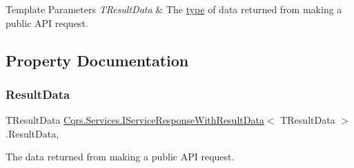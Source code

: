 \begin{DoxyTemplParams}{Template Parameters}
{\em T\+Result\+Data} & The \hyperlink{}{type} of data returned from making a public A\+PI request.\\
\hline
\end{DoxyTemplParams}


\subsection{Property Documentation}
\mbox{\label{interfaceCqrs_1_1Services_1_1IServiceResponseWithResultData_a9cca2c2341cc95f3c55fb2058c240dd1_a9cca2c2341cc95f3c55fb2058c240dd1}} 
\subsubsection{\texorpdfstring{Result\+Data}{ResultData}}
{\footnotesize\ttfamily T\+Result\+Data \hyperlink{interfaceCqrs_1_1Services_1_1IServiceResponseWithResultData}{Cqrs.\+Services.\+I\+Service\+Response\+With\+Result\+Data}$<$ T\+Result\+Data $>$.Result\+Data\hspace{0.3cm}{\ttfamily [get]}, {\ttfamily [set]}}



The data returned from making a public A\+PI request. 

